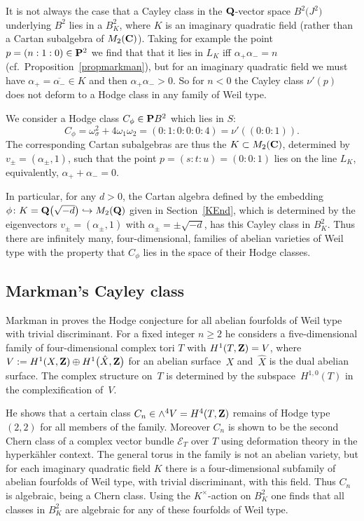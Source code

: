 \documentclass[10pt,a4paper]{amsart}
\numberwithin{equation}{section}
\begin{document}
It is not always the case that a Cayley class in the ${\bf Q}$-vector space $B^2\big(J^2\big)$
underlying $B^2$ lies in a $B^2_K$, where $K$ is an imaginary quadratic field (rather than a
Cartan subalgebra of $M_2({\bf C})$). Taking for example the point $p=(n:1:0)\in {\bf P}^2$ we find that
that it lies in $L_K$ iff $\alpha_+\alpha_-=n$ (cf.\ Proposition~\ref{propmarkman}),
but for an imaginary quadratic field we must have
$\alpha_+=\overline{\alpha_-}\in K$ and then $\alpha_+\alpha_->0$. So for $n<0$ the Cayley class
$\nu'(p)$ does not deform to a Hodge class in any family of Weil type.

\begin{Example} We consider a Hodge class $C_\phi\in {\bf P} B^2$ which lies
in $S$:
\[
C_\phi = \omega_\sigma^2 + 4\omega_1\omega_2 = (0:1:0:0:0:4) = \nu'((0:0:1)).
\]
The corresponding Cartan subalgebras are thus the $K\subset M_2({\bf C})$,
determined by $v_\pm=(\alpha_\pm,1)$, such that the point
$p=(s:t:u)=(0:0:1)$ lies on the line $L_K$,
equivalently, $\alpha_++\alpha_-=0$.

In particular, for any $d>0$, the Cartan algebra defined by
the embedding $\phi\colon K={\bf Q}\big(\sqrt{-d}\big)\allowbreak \hookrightarrow M_2({\bf Q})$ given in Section~\ref{KEnd},
which is determined by the eigenvectors $v_\pm=(\alpha_\pm,1)$ with $\alpha_\pm=\pm\sqrt{-d}$,
has this Cayley class in $B^2_K$. Thus there are infinitely many, four-dimensional,
families of abelian varieties of Weil type with the property that $C_\phi$ lies
in the space of their Hodge classes.
\end{Example}

\subsection{Markman's Cayley class}
Markman in \cite{Markman} proves the Hodge conjecture
for all abelian fourfolds of Weil type with trivial discriminant.
For a fixed integer $n\geq 2$ he considers a
five-dimensional family of four-dimensional complex tori $T$ with
$H^1(T,{\bf Z})=V$, where $V:=H^1(X,{\bf Z})\oplus H^1\big(\hat{X},{\bf Z}\big)$ for an
abelian surface~$X$ and~$\hat{X}$ is the dual abelian surface.
The complex structure on~$T$ is determined by the subspace~$H^{1,0}(T)$
in the complexification of~$V$.

He shows that a certain class $C_n\in \wedge^4V= H^4(T,{\bf Z})$ remains of Hodge type $(2,2)$
for all members of the family. Moreover $C_n$ is shown to be
the second Chern class of a complex vector bundle ${\mathcal E}_T$ over $T$
using deformation theory in the hyperk\"ahler context.
The general torus in the family is not an abelian variety, but for each
imaginary quadratic field $K$ there is a four-dimensional subfamily of
abelian fourfolds of Weil type, with trivial discriminant, with this field.
Thus $C_n$ is algebraic, being a Chern class. Using the $K^\times$-action on $B^2_K$
one finds that all classes in $B^2_K$ are algebraic for any of these fourfolds of Weil type.
\end{document}
